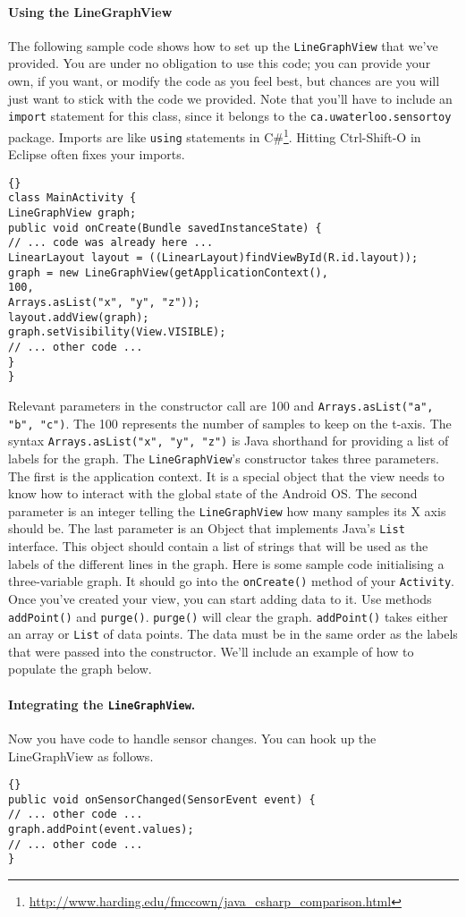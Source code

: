 \documentclass[10pt]{article}
\begin{document}
\paragraph{Using the LineGraphView}
The following sample code shows how to set up the
{\tt LineGraphView} that we've provided. You are under
no obligation to use this code; you can provide your own,
if you want, or modify the code as you feel best, but chances are you
will just want to stick with the code we provided.
Note that you'll have to include an {\tt import} statement for this
class, since it belongs to the {\tt ca.uwaterloo.sensortoy}
package. Imports are like {\tt using} statements in C\#\footnote{\url{http://www.harding.edu/fmccown/java_csharp_comparison.html}}. Hitting Ctrl-Shift-O in Eclipse often fixes your imports.
\begin{lstlisting}{}
class MainActivity {
LineGraphView graph;
public void onCreate(Bundle savedInstanceState) {
// ... code was already here ...
LinearLayout layout = ((LinearLayout)findViewById(R.id.layout));
graph = new LineGraphView(getApplicationContext(),
100,
Arrays.asList("x", "y", "z"));
layout.addView(graph);
graph.setVisibility(View.VISIBLE);
// ... other code ...
}
}
\end{lstlisting}
Relevant parameters in the
constructor call are 100 and \verb+Arrays.asList("a", "b", "c")+. The 100 represents the number of samples to keep on the
t-axis. The syntax {\tt Arrays.asList("x", "y", "z")} is Java
shorthand for providing a list of labels for the graph.
The {\tt LineGraphView}'s constructor takes three parameters. The first is the application context. It is a special object that the view needs to know how to interact with the global state of the Android OS. The second parameter is an integer telling the {\tt LineGraphView} how many samples its X axis should be. The last parameter is an Object that implements Java's {\tt List} interface. This object should contain a list of strings that will be used as the labels of the different lines in the graph. Here is some sample code initialising a three-variable graph. It should go into the {\tt onCreate()} method of your {\tt Activity}.
Once you've created your view, you can start adding data to it. Use methods {\tt addPoint()} and {\tt purge()}. {\tt purge()} will clear the graph. {\tt addPoint()} takes either an array or {\tt List} of data points. The data must be in the same order as the labels that were passed into the constructor. We'll include an example of how to populate the graph below.
\paragraph{Integrating the {\tt LineGraphView}.} Now you have code to handle sensor changes. You can hook up the LineGraphView as follows.
\begin{lstlisting}{}
public void onSensorChanged(SensorEvent event) {
// ... other code ...
graph.addPoint(event.values);
// ... other code ...
}
\end{lstlisting}
\end{document}
